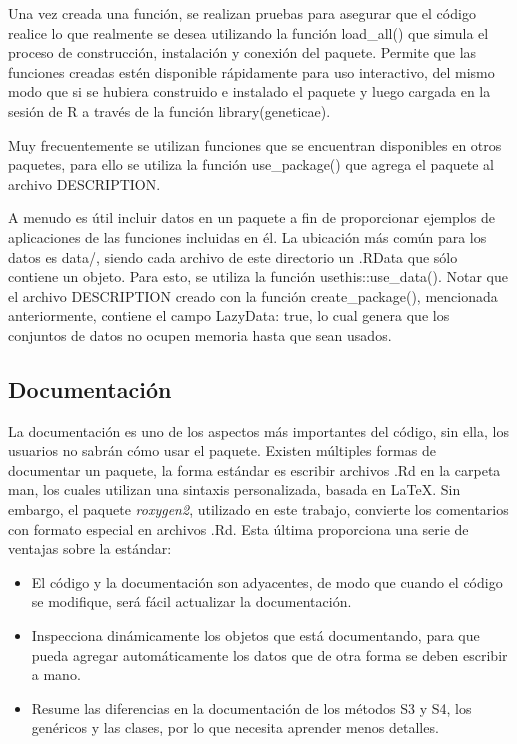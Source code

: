 Una vez creada una función, se realizan pruebas para asegurar que el código realice lo que realmente se desea utilizando la función load\_all() que simula el proceso de construcción, instalación y conexión del paquete. Permite que las funciones creadas estén disponible rápidamente para uso interactivo, del mismo modo que si se hubiera construido e instalado el paquete y luego cargada en la sesión de R a través de la función library(geneticae).

Muy frecuentemente se utilizan funciones que se encuentran disponibles en otros paquetes, para ello se utiliza la función use\_package() que agrega el paquete al archivo DESCRIPTION.

A menudo es útil incluir datos en un paquete a fin de proporcionar ejemplos de aplicaciones de las funciones incluidas en él. La ubicación más común para los datos es data/, siendo cada archivo de este directorio un .RData que sólo contiene un objeto. Para esto, se utiliza la función usethis::use\_data(). Notar que el archivo DESCRIPTION creado con la función create\_package(), mencionada anteriormente, contiene el campo LazyData: true, lo cual genera que los conjuntos de datos no ocupen memoria hasta que sean usados.

\subsection{Documentación}

La documentación es uno de los aspectos más importantes del código, sin ella, los usuarios no sabrán cómo usar el paquete. Existen múltiples formas de documentar un paquete, la forma estándar es escribir archivos .Rd en la carpeta man, los cuales utilizan una sintaxis personalizada, basada en LaTeX. Sin embargo, el paquete \emph{roxygen2}, utilizado en este trabajo, convierte los comentarios con formato especial en archivos .Rd. Esta última proporciona una serie de ventajas sobre la estándar:

\begin{itemize}
\item El código y la documentación son adyacentes, de modo que cuando el código se modifique, será fácil actualizar la documentación.

\item Inspecciona dinámicamente los objetos que está documentando, para que pueda agregar automáticamente los datos que de otra forma se deben escribir a mano.

\item Resume las diferencias en la documentación de los métodos S3 y S4, los genéricos y las clases, por lo que necesita aprender menos detalles.
\end{itemize}

